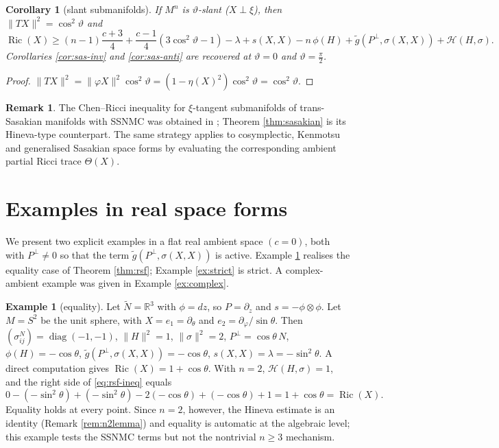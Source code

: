 \documentclass[11pt]{article}
\newtheorem{corollary}[theorem]{Corollary}
\theoremstyle{definition}
\newtheorem{remark}[theorem]{Remark}
\newtheorem{example}[theorem]{Example}
\newcommand{\tN}{\widetilde{N}}
\newcommand{\tg}{\widetilde{g}}
\newcommand{\Ric}{\operatorname{Ric}}
\newcommand{\HH}{\mathcal{H}}
\begin{document}
\begin{corollary}[slant submanifolds]\label{cor:sas-slant}
If $M^n$ is $\vartheta$-slant ($X\perp\xi$), then $\|TX\|^2=\cos^2\vartheta$ and
\begin{equation}\label{eq:sas-slant}
\Ric(X)\ge(n-1)\frac{c+3}{4}+\frac{c-1}{4}(3\cos^2\vartheta-1)-\lambda+s(X,X)-n\,\phi(H)+\tg(P^\perp,\sigma(X,X))+\HH(H,\sigma).
\end{equation}
Corollaries \ref{cor:sas-inv} and \ref{cor:sas-anti} are recovered at $\vartheta=0$ and $\vartheta=\tfrac\pi2$.
\end{corollary}
\begin{proof}
$\|TX\|^2=\|\varphi X\|^2\cos^2\vartheta=(1-\eta(X)^2)\cos^2\vartheta=\cos^2\vartheta$.
\end{proof}

\begin{remark}\label{rem:sas-hist}
The Chen--Ricci inequality for $\xi$-tangent submanifolds of trans-Sasakian manifolds with SSNMC was obtained in \cite{Moh2}; Theorem \ref{thm:sasakian} is its Hineva-type counterpart. The same strategy applies to cosymplectic, Kenmotsu and generalised Sasakian space forms \cite{ABC} by evaluating the corresponding ambient partial Ricci trace $\Theta(X)$.
\end{remark}

\section{Examples in real space forms}\label{sec:examples}

We present two explicit examples in a flat real ambient space $(c=0)$, both with $P^\perp\neq0$ so that the term $\tg(P^\perp,\sigma(X,X))$ is active. Example \ref{ex:eq-sphere} realises the equality case of Theorem \ref{thm:rsf}; Example \ref{ex:strict} is strict. A complex-ambient example was given in Example \ref{ex:complex}.

\begin{example}[equality]\label{ex:eq-sphere}
Let $\tN=\mathbb{R}^3$ with $\phi=dz$, so $P=\partial_z$ and $s=-\phi\otimes\phi$. Let $M=S^2$ be the unit sphere, with $X=e_1=\partial_\theta$ and $e_2=\partial_\varphi/\sin\theta$. Then $(\sigma^N_{ij})=\operatorname{diag}(-1,-1)$, $\|H\|^2=1$, $\|\sigma\|^2=2$, $P^\perp=\cos\theta\,N$, $\phi(H)=-\cos\theta$, $\tg(P^\perp,\sigma(X,X))=-\cos\theta$, $s(X,X)=\lambda=-\sin^2\theta$. A direct computation gives $\Ric(X)=1+\cos\theta$. With $n=2$, $\HH(H,\sigma)=1$, and the right side of \eqref{eq:rsf-ineq} equals
\[
0-(-\sin^2\theta)+(-\sin^2\theta)-2(-\cos\theta)+(-\cos\theta)+1=1+\cos\theta=\Ric(X).
\]
Equality holds at every point. Since $n=2$, however, the Hineva estimate is an identity (Remark \ref{rem:n2lemma}) and equality is automatic at the algebraic level; this example tests the SSNMC terms but not the nontrivial $n\ge3$ mechanism.
\end{example}
\end{document}
